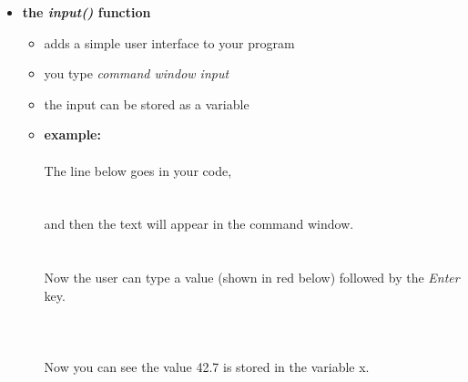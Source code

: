 \documentclass[11pt]{article}
\begin{document}
\begin{itemize}
\begin{itemize}
			\newpage
			
			\item \textbf{ \Large the \LARGE{\it input()} \Large function} 
            			\Large
            				\begin{itemize}
            					\item adds a simple user interface to your program \\
            					\item you type {\it command window input} \\
            					\item the input can be stored as a variable	\\
            					\item {\bf example:} \\\\
            						The line below goes in your code,\\\\
            						 \\
            						
            						and then the text will appear in the command window. \\\\
            						 \\
            						
            						Now the user  can type a value (shown in red below) followed by the {\it Enter} key. \\\\	
            						
            						 \\\\
            						
            						Now you can see the value 42.7 is stored in the variable x.
            				\end{itemize}
            				
            			

		\end{itemize}



\end{itemize}


	
\end{document}

